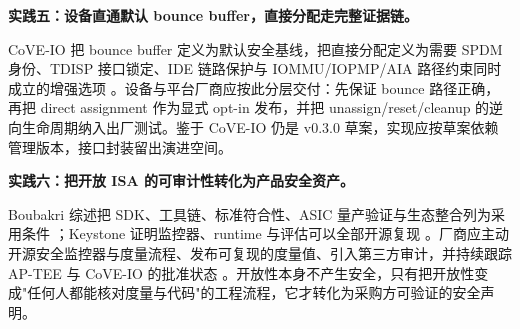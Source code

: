 \documentclass[11pt]{ctexart}
\begin{document}
\noindent\textbf{实践五：设备直通默认 bounce buffer，直接分配走完整证据链。}\par
CoVE-IO 把 bounce buffer 定义为默认安全基线，把直接分配定义为需要 SPDM 身份、TDISP 接口锁定、IDE 链路保护与 IOMMU/IOPMP/AIA 路径约束同时成立的增强选项 \cite{riscv_cove_io_2026,riscv_iommu_2023,riscv_aia_2023}。设备与平台厂商应按此分层交付：先保证 bounce 路径正确，再把 direct assignment 作为显式 opt-in 发布，并把 unassign/reset/cleanup 的逆向生命周期纳入出厂测试。鉴于 CoVE-IO 仍是 v0.3.0 草案，实现应按草案依赖管理版本，接口封装留出演进空间。\par
\noindent\textbf{实践六：把开放 ISA 的可审计性转化为产品安全资产。}\par
Boubakri 综述把 SDK、工具链、标准符合性、ASIC 量产验证与生态整合列为采用条件 \cite{boubakri2025riscvtee}；Keystone 证明监控器、runtime 与评估可以全部开源复现 \cite{lee2020keystone}。厂商应主动开源安全监控器与度量流程、发布可复现的度量值、引入第三方审计，并持续跟踪 AP-TEE 与 CoVE-IO 的批准状态 \cite{riscv_ap_tee_2024,riscv_cove_io_2026}。开放性本身不产生安全，只有把开放性变成"任何人都能核对度量与代码"的工程流程，它才转化为采购方可验证的安全声明。\par
\end{document}
